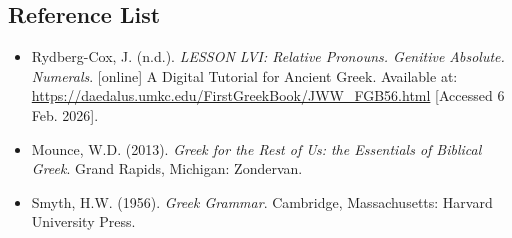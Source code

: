 \documentclass[10pt,a4paper,notitlepage]{article}
\begin{document}
    \subsection*{Reference List}
    \begin{itemize}[label={}, leftmargin=0]
        \item Rydberg-Cox, J. (n.d.). \textit{LESSON LVI: Relative Pronouns. Genitive Absolute. Numerals}. [online] A Digital Tutorial for Ancient Greek. Available at: \url{https://daedalus.umkc.edu/FirstGreekBook/JWW_FGB56.html} [Accessed 6 Feb. 2026].
        \item Mounce, W.D. (2013). \textit{Greek for the Rest of Us: the Essentials of Biblical Greek}. Grand Rapids, Michigan: Zondervan.
        \item Smyth, H.W. (1956). \textit{Greek Grammar}. Cambridge, Massachusetts: Harvard University Press.
    \end{itemize}
\end{document}
